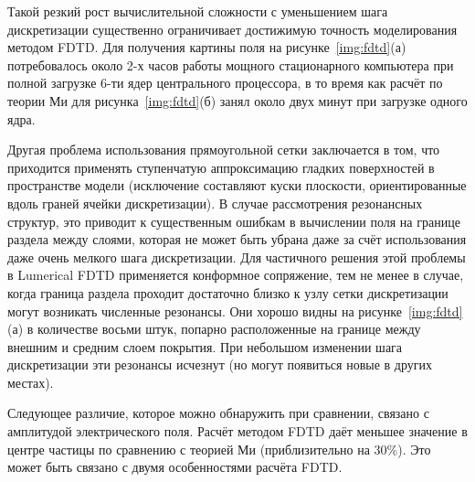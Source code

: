 Такой резкий рост вычислительной сложности с уменьшением шага
дискретизации существенно ограничивает достижимую точность
моделирования методом FDTD. Для получения картины поля на
рисунке~\ref{img:fdtd}(а) потребовалось около 2-х часов работы мощного
стационарного компьютера при полной загрузке 6-ти ядер центрального
процессора, в то время как расчёт по теории Ми для
рисунка~\ref{img:fdtd}(б) занял около двух минут при загрузке одного
ядра.

Другая проблема использования прямоугольной сетки заключается в том,
что приходится применять ступенчатую аппроксимацию гладких поверхностей
в пространстве модели (исключение составляют куски плоскости,
ориентированные вдоль граней ячейки дискретизации). В случае
рассмотрения резонансных структур, это приводит к существенным ошибкам
в вычислении поля на границе раздела между слоями, которая не может
быть убрана даже за счёт использования даже очень мелкого шага
дискретизации.  Для частичного решения этой проблемы в Lumerical FDTD
применяется конформное сопряжение, тем не менее в случае, когда
граница раздела проходит достаточно близко к узлу сетки дискретизации
могут возникать численные резонансы. Они хорошо видны на
рисунке~\ref{img:fdtd}(а) в количестве восьми штук, попарно
расположенные на границе между внешним и средним слоем покрытия. При
небольшом изменении шага дискретизации эти резонансы исчезнут (но
могут появиться новые в других местах).

Следующее различие, которое можно обнаружить при сравнении, связано с
амплитудой электрического поля.  Расчёт методом FDTD даёт меньшее
значение в центре частицы  по сравнению с теорией Ми (приблизительно
на 30\%).  Это может быть связано с двумя особенностями расчёта
FDTD.

